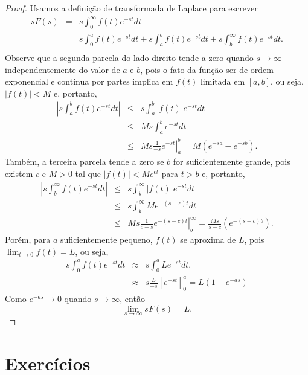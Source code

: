 \begin{proof}Usamos a definição de transformada de Laplace para escrever
\begin{eqnarray*}
sF(s)&=&s\int_0^\infty f(t)e^{-st}dt\\
&=&s\int_0^a f(t)e^{-st}dt+s\int_a^b f(t)e^{-st}dt+s\int_b^\infty f(t)e^{-st}dt.\\
\end{eqnarray*}
Observe que a segunda parcela do lado direito tende a zero quando $s\to \infty$ independentemente do valor de $a$ e $b$, pois o fato da função ser de ordem exponencial e contínua por partes implica em $f(t)$ limitada em $[a,b]$, ou seja, $|f(t)|<M$ e, portanto,
\begin{eqnarray*}
\left|s\int_a^b f(t)e^{-st}dt\right|&\leq & s\int_a^b |f(t)|e^{-st}dt\\
&\leq & Ms\int_a^b e^{-st}dt\\
&\leq & \left.Ms\frac{1}{-s} e^{-st}\right|_a^b=M(e^{-sa}-e^{-sb}).
\end{eqnarray*}
Também, a terceira parcela tende a zero se $b$ for suficientemente grande, pois existem $c$ e $M>0$ tal que $|f(t)|<Me^{ct}$ para $t>b$ e, portanto,
\begin{eqnarray*}
\left|s\int_b^\infty f(t)e^{-st}dt\right|&\leq & s\int_b^\infty |f(t)|e^{-st}dt\\
&\leq & s\int_b^\infty Me^{-(s-c)t}dt\\
&\leq & \left.Ms\frac{1}{c-s} e^{-(s-c)t}\right|_b^\infty=\frac{Ms}{s-c}(e^{-(s-c)b}).
\end{eqnarray*}
Porém, para $a$ suficientemente pequeno, $f(t)$ se aproxima de $L$, pois $\displaystyle \lim_{t\to 0}f(t)=L$, ou seja,
\begin{eqnarray*}
s\int_0^a f(t)e^{-st}dt &\approx &s\int_0^a L e^{-st}dt.\\
&\approx &s\frac{L}{-s}\left[ e^{-st}\right]_0^a=L\left(1-e^{-as}\right)
\end{eqnarray*}
Como $e^{-as}\to 0$ quando $s\to \infty$, então
\begin{equation}
\lim_{s\to \infty} sF(s)=L.
\end{equation} 
\end{proof}


\section{Exercícios}

